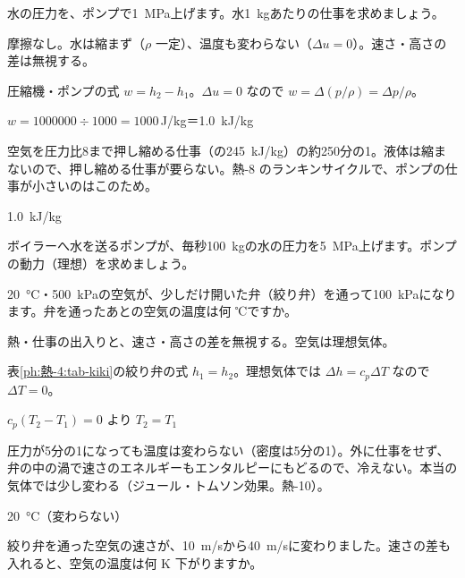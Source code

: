 \begin{reidai}[水のポンプの仕事]
\label{ph:熱-4:ex6}水の圧力を、ポンプで\qty{1}{MPa}上げます。水\qty{1}{kg}あたりの仕事を求めましょう。
\par{} 摩擦なし。水は縮まず（$\rho$ 一定）、温度も変わらない（$\Delta u=0$）。速さ・高さの差は無視する。
\par\kangaekata 圧縮機・ポンプの式 $w=h_2-h_1$。$\Delta u=0$ なので $w=\Delta(p/\rho)=\Delta p/\rho$。
\par\shiki $w=\num{1000000}\div1000=\num{1000}$\,J/kg＝\qty{1.0}{kJ/kg}
\par{} 空気を圧力比8まで押し縮める仕事（の\qty{245}{kJ/kg}）の約250分の1。液体は縮まないので、押し縮める仕事が要らない。熱-8 のランキンサイクルで、ポンプの仕事が小さいのはこのため。
\par\kotae \qty{1.0}{kJ/kg}
\end{reidai}
\begin{jibun}
ボイラーへ水を送るポンプが、毎秒\qty{100}{kg}の水の圧力を\qty{5}{MPa}上げます。ポンプの動力（理想）を求めましょう。
\end{jibun}

\begin{reidai}[絞り弁を通る空気]
\label{ph:熱-4:ex7}\qty{20}{\celsius}・\qty{500}{kPa}の空気が、少しだけ開いた弁（絞り弁）を通って\qty{100}{kPa}になります。弁を通ったあとの空気の温度は何 ℃ですか。
\par{} 熱・仕事の出入りと、速さ・高さの差を無視する。空気は理想気体。
\par\kangaekata 表\ref{ph:熱-4:tab-kiki}の絞り弁の式 $h_1=h_2$。理想気体では $\Delta h=c_p\Delta T$ なので $\Delta T=0$。
\par\shiki $c_p(T_2-T_1)=0$ より $T_2=T_1$
\par{} 圧力が5分の1になっても温度は変わらない（密度は5分の1）。外に仕事をせず、弁の中の渦で速さのエネルギーもエンタルピーにもどるので、冷えない。本当の気体では少し変わる（ジュール・トムソン効果。熱-10）。
\par\kotae \qty{20}{\celsius}（変わらない）
\end{reidai}
\begin{jibun}
絞り弁を通った空気の速さが、\qty{10}{m/s}から\qty{40}{m/s}に変わりました。速さの差も入れると、空気の温度は何 K 下がりますか。
\end{jibun}

